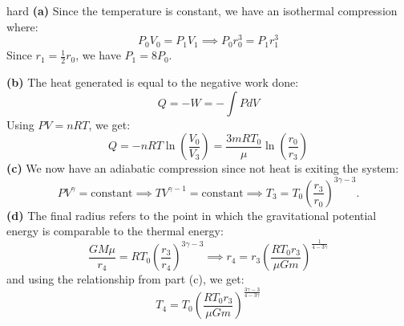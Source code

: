 \begin{solution}{hard}
\textbf{(a)} Since the temperature is constant, we have an isothermal compression where:
$$P_0V_0=P_1V_1 \implies P_0r_0^3 = P_1r_1^3$$Since $r_1=\frac{1}{2}r_0$, we have $P_1=8P_0$.
\vspace{2mm}

\textbf{(b)} The heat generated is equal to the negative work done:
$$Q=-W=-\int P dV$$Using $PV=nRT$, we get:
$$Q=-nRT\ln\left(\frac{V_0}{V_3}\right)=\frac{3mRT_0}{\mu}\ln\left(\frac{r_0}{r_3}\right)$$
\textbf{(c)} We now have an adiabatic compression since not heat is exiting the system:
$$PV^\gamma=\text{constant} \implies TV^{\gamma-1}=\text{constant} \implies T_3=T_0\left(\frac{r_3}{r_0}\right)^{3\gamma-3}.$$
\textbf{(d)} The final radius refers to the point in which the gravitational potential energy is comparable to the thermal energy:
$$\frac{GM\mu}{r_4}=RT_0\left(\frac{r_3}{r_4}\right)^{3\gamma-3}\implies r_4=r_3\left(\frac{RT_0r_3}{\mu Gm}\right)^\frac{1}{4-3\gamma}$$and using the relationship from part (c), we get:
$$T_4=T_0\left(\frac{RT_0r_3}{\mu Gm}\right)^\frac{3\gamma-3}{4-3\gamma}$$
\end{solution}